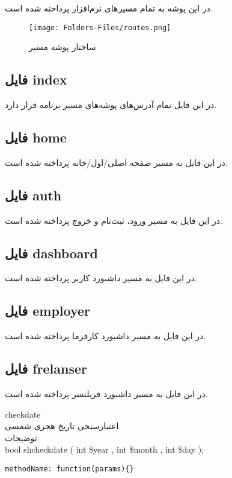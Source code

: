 در این پوشه به تمام مسیر‌های نرم‌افزار پرداخته شده است.

\begin{figure}[H]
	\texttt{[image: Folders-Files/routes.png]}
	\centering
	\caption{ساختار پوشه مسیر}
	\label{fig:folder-routes}
\end{figure}

\subsection{فایل index}
در این فایل تمام آدرس‌های پوشه‌های مسیر برنامه قرار دارد.

\subsection{فایل home}
در این فایل به مسیر صفحه اصلی/اول/خانه پرداخته شده است.

\subsection{فایل auth}
در این فایل به مسیر ورود، ثبت‌نام و خروج پرداخته شده است.

\subsection{فایل dashboard}
در این فایل به مسیر داشبورد کاربر پرداخته شده است.

\subsection{فایل employer}
در این فایل به مسیر داشبورد کارفرما پرداخته شده است.

\subsection{فایل frelanser}
در این فایل به مسیر داشبورد فریلنسر پرداخته شده است.



checkdate
\\
 اعتبارسنجی تاریخ هجری شمسی
\\
توضیحات
\\
bool shcheckdate ( int \$year , int \$month , int \$day );

\begin{lstlisting}[caption=My Javascript Example]
			methodName: function(params){}
\end{lstlisting}



